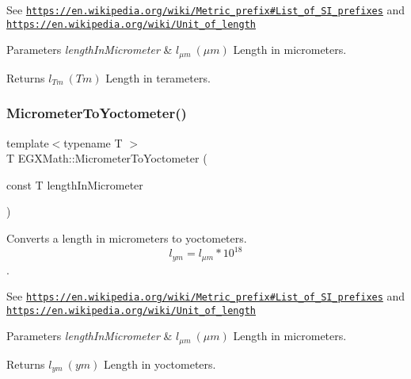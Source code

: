 See \href{https://en.wikipedia.org/wiki/Metric_prefix#List_of_SI_prefixes}{\tt https\+://en.\+wikipedia.\+org/wiki/\+Metric\+\_\+prefix\#\+List\+\_\+of\+\_\+\+S\+I\+\_\+prefixes} and \href{https://en.wikipedia.org/wiki/Unit_of_length}{\tt https\+://en.\+wikipedia.\+org/wiki/\+Unit\+\_\+of\+\_\+length} 
\begin{DoxyParams}{Parameters}
{\em length\+In\+Micrometer} & $ l_{\mu m}\ (\mu m)$ Length in micrometers. \\
\hline
\end{DoxyParams}
\begin{DoxyReturn}{Returns}
$ l_{Tm}\ (Tm)$ Length in terameters. 
\end{DoxyReturn}
\mbox{\label{group___e_g_x_math-_conversions-_length_conversions-_micrometer-_s_i_ga58e346f8863d6679fecc09c55e253116}} 
\subsubsection{\texorpdfstring{Micrometer\+To\+Yoctometer()}{MicrometerToYoctometer()}}
{\footnotesize\ttfamily template$<$typename T $>$ \\
T E\+G\+X\+Math\+::\+Micrometer\+To\+Yoctometer (\begin{DoxyParamCaption}\item[{const T}]{length\+In\+Micrometer }\end{DoxyParamCaption})}



Converts a length in micrometers to yoctometers. \[ l_{ym}=l_{\mu m} * 10^{18} \]. 

See \href{https://en.wikipedia.org/wiki/Metric_prefix#List_of_SI_prefixes}{\tt https\+://en.\+wikipedia.\+org/wiki/\+Metric\+\_\+prefix\#\+List\+\_\+of\+\_\+\+S\+I\+\_\+prefixes} and \href{https://en.wikipedia.org/wiki/Unit_of_length}{\tt https\+://en.\+wikipedia.\+org/wiki/\+Unit\+\_\+of\+\_\+length} 
\begin{DoxyParams}{Parameters}
{\em length\+In\+Micrometer} & $ l_{\mu m}\ (\mu m)$ Length in micrometers. \\
\hline
\end{DoxyParams}
\begin{DoxyReturn}{Returns}
$ l_{ym}\ (ym)$ Length in yoctometers. 
\end{DoxyReturn}
\mbox{\label{group___e_g_x_math-_conversions-_length_conversions-_micrometer-_s_i_gaeea13656a8abffb34144175cba3b9afc}} 
